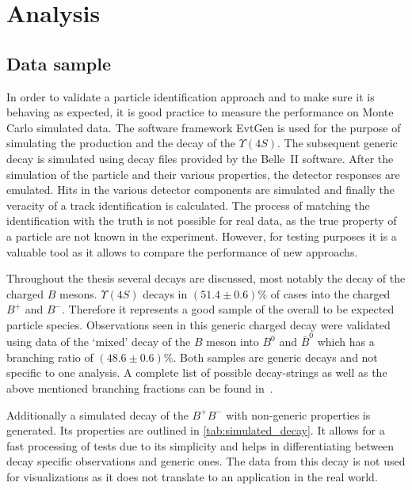 \chapter{Analysis}
\label{chap:analysis}

\section{Data sample}
\label{sec:data_sample}

In order to validate a particle identification approach and to make sure it is behaving as expected, it is good practice to measure the performance on Monte Carlo simulated data. The software framework EvtGen is used for the purpose of simulating the production and the decay of the $\Upsilon(4S)$. The subsequent generic decay is simulated using decay files provided by the Belle~\RN{2} software. After the simulation of the particle and their various properties, the detector responses are emulated. Hits in the various detector components are simulated and finally the veracity of a track identification is calculated. The process of matching the identification with the truth is not possible for real data, as the true property of a particle are not known in the experiment. However, for testing purposes it is a valuable tool as it allows to compare the performance of new approachs.

Throughout the thesis several decays are discussed, most notably the decay of the charged $B$ mesons. $\Upsilon(4S)$ decays in $(51.4 \pm 0.6) \%$ of cases into the charged $B^+$ and $B^-$. Therefore it represents a good sample of the overall to be expected particle species. Observations seen in this generic charged decay were validated using data of the `mixed' decay of the $B$ meson into $B^0$ and $\bar{B}^0$ which has a branching ratio of $(48.6 \pm 0.6) \%$. Both samples are generic decays and not specific to one analysis. A complete list of possible decay-strings as well as the above mentioned branching fractions can be found in~\cite{Patrignani:2016xqp}.

Additionally a simulated decay of the $B^+ B^-$ with non-generic properties is generated. Its properties are outlined in \autoref{tab:simulated_decay}. It allows for a fast processing of tests due to its simplicity and helps in differentiating between decay specific observations and generic ones. The data from this decay is not used for visualizations as it does not translate to an application in the real world.

